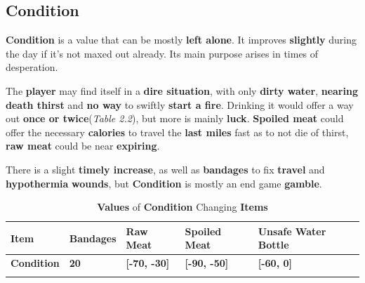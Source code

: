 		\subsection{Condition}
			\par \textbf{Condition} is a value that can be mostly \textbf{left alone}. It improves \textbf{slightly} during the day if it's not maxed out already.  Its main purpose arises in times of desperation.
			\par The \textbf{player} may find itself in a \textbf{dire situation}, with only \textbf{dirty water}, \textbf{nearing death thirst} and \textbf{no way} to swiftly \textbf{start a fire}. Drinking it would offer a way out \textbf{once or twice}(\textit{Table 2.2}), but more is mainly \textbf{luck}. \textbf{Spoiled meat} could offer the necessary \textbf{calories} to travel the \textbf{last miles} fast as to not die of thirst, \textbf{raw meat} could be near \textbf{expiring}.
			\par There is a slight \textbf{timely increase}, as well as \textbf{bandages} to fix \textbf{travel} and \textbf{hypothermia} \textbf{wounds}, but \textbf{Condition} is mostly an end game \textbf{gamble}.

			\begin{longtable}{|C{6em}|C{6em}|C{6em}|C{6em}|C{9em}|}
			   \toprule
			    \textcolor[rgb]{ 1,  1,  1}{\textbf{Item}} & \textbf{Bandages} & \textbf{Raw Meat} & \textbf{Spoiled Meat}  & \textbf{Unsafe Water Bottle}   \\
			    \midrule
			     \textcolor[rgb]{ 1,  1,  1}{\textbf{Condition}}  & \textbf{20} & \textbf{[-70, -30]} & \textbf{[-90, -50]} & \textbf{[-60, 0]} \\	
			    \bottomrule	
			\caption{\textbf{Values} of \textbf{Condition} Changing \textbf{Items}}
			\end{longtable}
		
